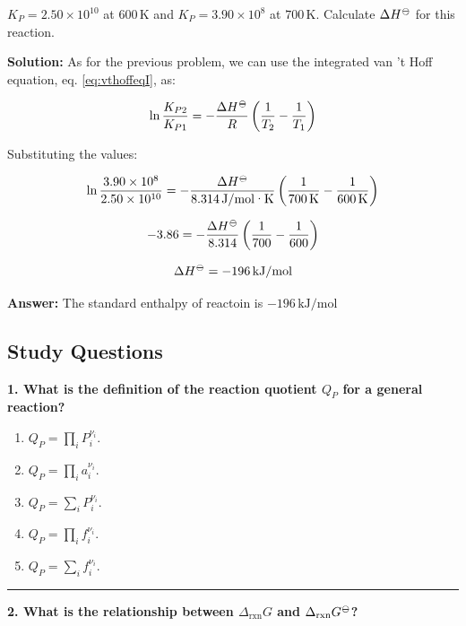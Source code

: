 \documentclass[
  9pt,
]{extbook}
\providecommand{\tightlist}{%
  \setlength{\itemsep}{0pt}\setlength{\parskip}{0pt}}
\theoremstyle{definition}
\theoremstyle{definition}
\theoremstyle{definition}
\theoremstyle{remark}
\begin{document}
\(K_P = 2.50 \times 10^{10}\) at \(600\,\text{K}\) and \(K_P = 3.90 \times 10^8\) at \(700\,\text{K}\). Calculate \(\Delta H^{{-\kern-6pt{\ominus}\kern-6pt-}}\) for this reaction.

\textbf{Solution:} As for the previous problem, we can use the integrated van 't Hoff equation, eq. \eqref{eq:vthoffeqI}, as:

\[\ln \frac{K_{P2}}{K_{P1}} = -\frac{\Delta H^{{-\kern-6pt{\ominus}\kern-6pt-}}}{R}\left(\frac{1}{T_2} - \frac{1}{T_1}\right)\]

Substituting the values:

\[\ln \frac{3.90 \times 10^8}{2.50 \times 10^{10}} = -\frac{\Delta H^{{-\kern-6pt{\ominus}\kern-6pt-}}}{8.314\,\text{J/mol·K}}\left(\frac{1}{700\,\text{K}} - \frac{1}{600\,\text{K}}\right)\]

\[-3.86 = -\frac{\Delta H^{{-\kern-6pt{\ominus}\kern-6pt-}}}{8.314}\left(\frac{1}{700} - \frac{1}{600}\right)\]

\[\Delta H^{{-\kern-6pt{\ominus}\kern-6pt-}} = -196\,\text{kJ/mol}\]

\textbf{Answer:} The standard enthalpy of reactoin is \(-196\,\text{kJ/mol}\)

\hypertarget{quest10}{%
\subsection{Study Questions}\label{quest10}}

\textbf{1. What is the definition of the reaction quotient \(Q_P\) for a general reaction?}

\begin{enumerate}
\def\labelenumi{\alph{enumi}.}
\tightlist
\item
  \(Q_P = \prod_i P_i^{\nu_i}\).
\item
  \(Q_P = \prod_i a_i^{\nu_i}\).
\item
  \(Q_P = \sum_i P_i^{\nu_i}\).
\item
  \(Q_P = \prod_i f_i^{\nu_i}\).
\item
  \(Q_P = \sum_i f_i^{\nu_i}\).
\end{enumerate}

\begin{center}\rule{0.5\linewidth}{0.5pt}\end{center}

\textbf{2. What is the relationship between \(\Delta_{\text{rxn}}G\) and \(\Delta_{\text{rxn}}G^{{-\kern-6pt{\ominus}\kern-6pt-}}\)?}
\end{document}
